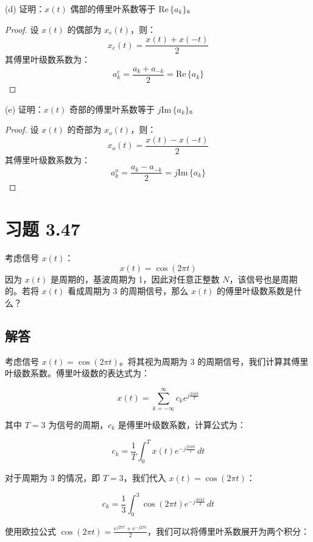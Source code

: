 \documentclass[UTF8]{report}
\def\Im{\mathrm{Im\,}}
\def\Re{\mathrm{Re\,}}
\theoremstyle{MyLineTheoremStyle} %
\theoremstyle{MyBlockTheoremStyle} %
\theoremstyle{MySubsubsectionStyle} %
\begin{document}
(d) 证明：$x(t)$ 偶部的傅里叶系数等于 $\Re\{a_k\}$。

\begin{proof}
设 $x(t)$ 的偶部为 $x_e(t)$，则：
\[
x_e(t) = \frac{x(t) + x(-t)}{2}
\]
其傅里叶级数系数为：
\[
a_k^e = \frac{a_k + a_{-k}}{2} = \Re\{a_k\}
\]
\end{proof}

(e) 证明：$x(t)$ 奇部的傅里叶系数等于 $j\Im\{a_k\}$。

\begin{proof}
设 $x(t)$ 的奇部为 $x_o(t)$，则：
\[
x_o(t) = \frac{x(t) - x(-t)}{2}
\]
其傅里叶级数系数为：
\[
a_k^o = \frac{a_k - a_{-k}}{2} = j\Im\{a_k\}
\]
\end{proof}

\section{习题 3.47}

考虑信号 $x(t)$：
\[
x(t) = \cos(2\pi t)
\]
因为 $x(t)$ 是周期的，基波周期为 1，因此对任意正整数 $N$，该信号也是周期的。若将 $x(t)$ 看成周期为 3 的周期信号，那么 $x(t)$ 的傅里叶级数系数是什么？

\subsection*{解答}

考虑信号 $x(t) = \cos(2\pi t)$。将其视为周期为 3 的周期信号，我们计算其傅里叶级数系数。傅里叶级数的表达式为：

\begin{equation}
x(t) = \sum_{k=-\infty}^{\infty} c_k e^{j \frac{2\pi k t}{T}}
\end{equation}

其中 $T = 3$ 为信号的周期，$c_k$ 是傅里叶级数系数，计算公式为：

\begin{equation}
c_k = \frac{1}{T} \int_0^T x(t) e^{-j \frac{2\pi k t}{T}} \, dt
\end{equation}

对于周期为 3 的情况，即 $T = 3$，我们代入 $x(t) = \cos(2\pi t)$：

\begin{equation}
c_k = \frac{1}{3} \int_0^3 \cos(2\pi t) e^{-j \frac{2\pi k t}{3}} \, dt
\end{equation}

使用欧拉公式 $\cos(2\pi t) = \frac{e^{j 2\pi t} + e^{-j 2\pi t}}{2}$，我们可以将傅里叶系数展开为两个积分：
\end{document}

